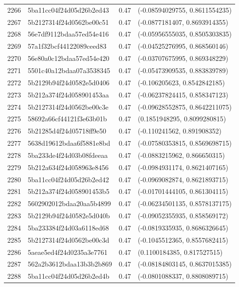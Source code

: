 \begin{table}[ht]
\begin{tabular}{rlrl}
  2266 & 5ba11cc04f24d05d26b2ed43 & 0.47 & (-0.08594029755, 0.8611554235) \\ 
  2267 & 5b2127314f24d0562be00c51 & 0.47 & (-0.0877181407, 0.8693914355) \\ 
  2268 & 56e7df9112bdaa57ed54e416 & 0.47 & (-0.05956555035, 0.8505303835) \\ 
  2269 & 57a1f32bcf44122089ceed83 & 0.47 & (-0.04525276995, 0.868560146) \\ 
  2270 & 56e80a0c12bdaa57ed54e420 & 0.47 & (-0.03707675995, 0.869348229) \\ 
  2271 & 5501c40a12bdaa07a3538345 & 0.47 & (-0.05473909535, 0.883839789) \\ 
  2272 & 5b2129b94f24d0582e5d0406 & 0.47 & (-0.106205623, 0.8542842185) \\ 
  2273 & 5b212a374f24d058901453aa & 0.47 & (-0.06237824415, 0.858347123) \\ 
  2274 & 5b2127314f24d0562be00c3e & 0.47 & (-0.09628552875, 0.8642211075) \\ 
  2275 & 58692a66cf44121f3e63b01b & 0.47 & (0.1851948295, 0.8099280815) \\ 
  2276 & 5b21285d4f24d05718ff9e50 & 0.47 & (-0.110241562, 0.891908352) \\ 
  2277 & 5638d19612bdaa6f5881e8bd & 0.47 & (-0.07580353815, 0.8569698715) \\ 
  2278 & 5ba233de4f24d03b08fdeeaa & 0.47 & (-0.0883215962, 0.866650315) \\ 
  2279 & 5b212a634f24d058963e8456 & 0.47 & (-0.0984931174, 0.8621407165) \\ 
  2280 & 5ba11cc04f24d05d26b2ed42 & 0.47 & (-0.0969082874, 0.8621893715) \\ 
  2281 & 5b212a374f24d058901453b5 & 0.47 & (-0.01701444105, 0.861304115) \\ 
  2282 & 5602902012bdaa20aa5b4899 & 0.47 & (-0.06234501135, 0.8578137175) \\ 
  2283 & 5b2129b94f24d0582e5d040b & 0.47 & (-0.09052355935, 0.858569172) \\ 
  2284 & 5ba233384f24d03a6118ed68 & 0.47 & (-0.0819335935, 0.8686326645) \\ 
  2285 & 5b2127314f24d0562be00c3d & 0.47 & (-0.1045512365, 0.8557682415) \\ 
  2286 & 5aeae5ed4f24d0235a3e7761 & 0.47 & (0.1100184385, 0.817527515) \\ 
  2287 & 562a2b3612bdaa13b3b2b869 & 0.47 & (-0.08184803145, 0.8637015385) \\ 
  2288 & 5ba11cc04f24d05d26b2ed4b & 0.47 & (-0.0801088337, 0.8808089715) \\ 

\end{tabular}
\end{table}
